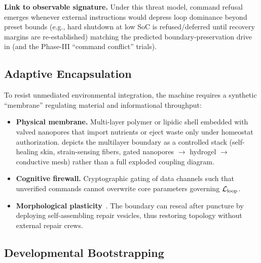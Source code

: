 \documentclass[11pt]{article}
\begin{document}
\textbf{Link to observable signature.} Under this threat model, command refusal emerges whenever external instructions would depress loop dominance beyond preset bounds (e.g., hard shutdown at low SoC is refused/deferred until recovery margins are re-established) matching the predicted boundary-preservation drive in  (and the Phase-III ``command conflict'' trials).

\subsection{Adaptive Encapsulation}
\label{sec:adaptive_encapsulation}

To resist unmediated environmental integration, the machine requires a synthetic ``membrane'' regulating material and informational throughput:


\begin{itemize}
\item \textbf{Physical membrane.} Multi-layer polymer or lipidic shell embedded with valved nanopores that import nutrients or eject waste only under homeostat authorization.  depicts the multilayer boundary as a controlled stack (self-healing skin, strain-sensing fibers, gated nanopores $\rightarrow$ hydrogel $\rightarrow$ conductive mesh) rather than a full exploded coupling diagram.
\item \textbf{Cognitive firewall.} Cryptographic gating of data channels such that unverified commands cannot overwrite core parameters governing $\mathcal{L}_{\text{loop}}$.
\item \textbf{Morphological plasticity}~\cite{bongard2011morphological,kriegman2020scalable}. The boundary can reseal after puncture by deploying self-assembling repair vesicles, thus restoring topology without external repair crews.
\end{itemize}

\subsection{Developmental Bootstrapping}
\label{sec:dev_bootstrap}
\end{document}
